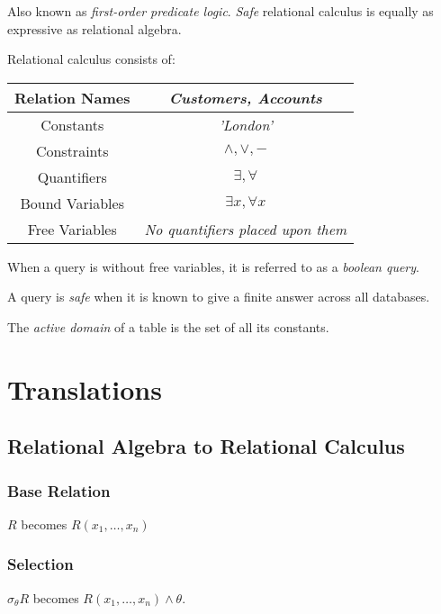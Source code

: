 \documentclass{article}
\begin{document}
Also known as \textit{first-order predicate logic}. \textit{Safe} relational calculus is equally as expressive as relational algebra.

Relational calculus consists of:

\begin{center}
  \begin{tabular}{|c|c|}
    \hline
    Relation Names & \textit{Customers, Accounts}\\
    \hline
    Constants & \textit{'London'}\\
    \hline
    Constraints & $\wedge, \vee, -$\\
    \hline
    Quantifiers & $\exists, \forall$\\
    \hline
    Bound Variables & $\exists x, \forall x$\\
    \hline
    Free Variables & \textit{No quantifiers placed upon them}\\
    \hline
  \end{tabular}
\end{center}

When a query is without free variables, it is referred to as a \textit{boolean query}.

A query is \textit{safe} when it is known to give a finite answer across all databases.

The \textit{active domain} of a table is the set of all its constants.

\section{Translations}

\subsection{Relational Algebra to Relational Calculus}

\subsubsection{Base Relation}

$R$ becomes $R(x_1, \ldots, x_n)$

\subsubsection{Selection}

$\sigma_{\theta} R$ becomes $R(x_1, \ldots, x_n) \wedge \theta$.
\end{document}
